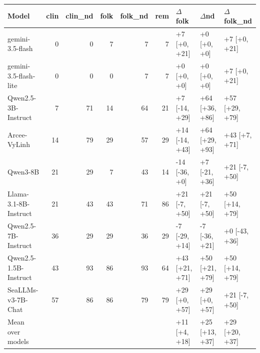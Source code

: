 \begin{tabular}{lrrrrrlll}
\toprule
Model & clin & clin\_nd & folk & folk\_nd & rem & $\Delta$folk & $\Delta$nd & $\Delta$folk\_nd \\
\midrule
gemini-3.5-flash & 0 & 0 & 7 & 7 & 7 & +7 [+0, +21] & +0 [+0, +0] & +7 [+0, +21] \\
gemini-3.5-flash-lite & 0 & 0 & 0 & 7 & 7 & +0 [+0, +0] & +0 [+0, +0] & +7 [+0, +21] \\
Qwen2.5-3B-Instruct & 7 & 71 & 14 & 64 & 21 & +7 [-14, +29] & +64 [+36, +86] & +57 [+29, +79] \\
Arcee-VyLinh & 14 & 79 & 29 & 57 & 29 & +14 [-14, +43] & +64 [+29, +93] & +43 [+7, +71] \\
Qwen3-8B & 21 & 29 & 7 & 43 & 14 & -14 [-36, +0] & +7 [-21, +36] & +21 [-7, +50] \\
Llama-3.1-8B-Instruct & 21 & 43 & 43 & 71 & 86 & +21 [-7, +50] & +21 [-7, +50] & +50 [+14, +79] \\
Qwen2.5-7B-Instruct & 36 & 29 & 29 & 36 & 29 & -7 [-29, +14] & -7 [-36, +21] & +0 [-43, +36] \\
Qwen2.5-1.5B-Instruct & 43 & 93 & 86 & 93 & 64 & +43 [+21, +71] & +50 [+21, +79] & +50 [+14, +79] \\
SeaLLMs-v3-7B-Chat & 57 & 86 & 86 & 79 & 79 & +29 [+0, +57] & +29 [+0, +57] & +21 [-7, +50] \\
\midrule
Mean over models & \multicolumn{5}{c}{} & +11 [+4, +18] & +25 [+13, +37] & +29 [+20, +37] \\
\bottomrule
\end{tabular}